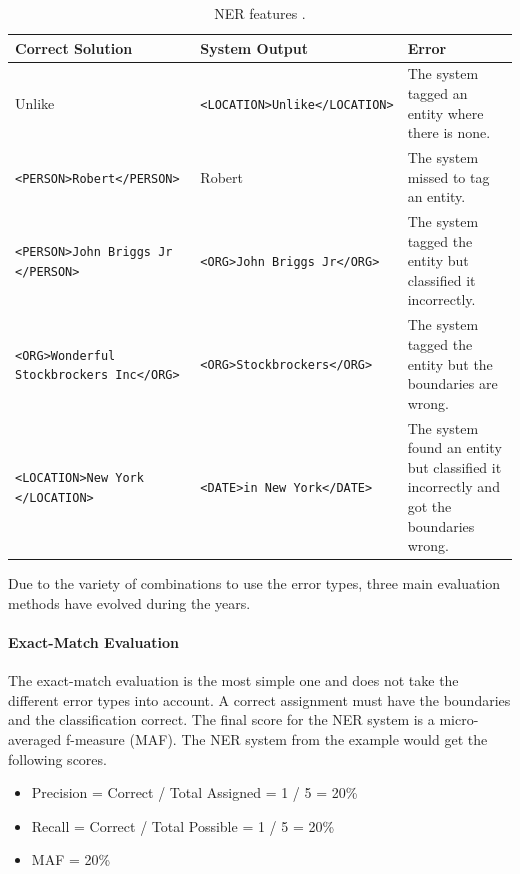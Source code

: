 \begin{table}[ht!]
\centering
\begin{tabularx}{\linewidth}{|X|X|X|}
\hline
Correct Solution	 		& 	System Output	& Error\\
\hline
\hline
Unlike						&	\verb$<LOCATION>Unlike</LOCATION>$	&	The system tagged an entity where there is none.\\
\hline
\verb$<PERSON>Robert</PERSON>$	&	Robert								& 	The system missed to tag an entity.\\
\hline
\verb$<PERSON>John Briggs Jr$ \verb$</PERSON>$	& \verb$<ORG>John Briggs Jr</ORG>$	&	The system tagged the entity but classified it incorrectly.\\
\hline
\verb$<ORG>Wonderful$ \verb$Stockbrockers Inc</ORG>$	&	\verb$<ORG>Stockbrockers</ORG>$	&	The system tagged the entity but the boundaries are wrong.\\
\hline
\verb$<LOCATION>New York$ \verb$</LOCATION>$	&	\verb$<DATE>in New York</DATE>$	&	The system found an entity but classified it incorrectly and got the boundaries wrong.\\
\hline
\end{tabularx} 
\caption{NER features \cite{nadeau2007yooname}.}
\label{tab:nererrors}
\end{table}

Due to the variety of combinations to use the error types, three main evaluation methods have evolved during the years.

\paragraph{Exact-Match Evaluation}
The exact-match evaluation is the most simple one and does not take the different error types into account. A correct assignment must have the boundaries and the classification correct. The final score for the NER system is a micro-averaged f-measure (MAF). The NER system from the example would get the following scores.
\begin{itemize}
\item Precision = Correct / Total Assigned = 1 / 5 = 20\%
\item Recall = Correct / Total Possible = 1 / 5 = 20\%
\item MAF = 20\%
\end{itemize}


